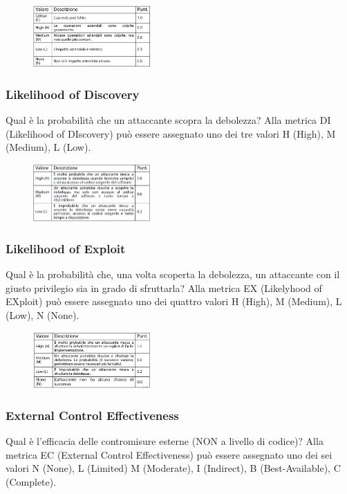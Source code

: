 \begin{figure}[hbpt!]
    \centering
    \includegraphics[width=0.4\textwidth]{./Images/cap3/3.15.png}
\end{figure}
\FloatBarrier

\subsubsection{Likelihood of Discovery}
Qual è la probabilità che un attaccante
scopra la debolezza? Alla metrica DI (Likelihood of DIscovery)
può essere assegnato uno dei tre valori
H (High), M (Medium), L (Low).

\begin{figure}[hbpt!]
    \centering
    \includegraphics[width=0.4\textwidth]{./Images/cap3/3.16.png}
\end{figure}
\FloatBarrier


\subsubsection{Likelihood of Exploit}
Qual è la probabilità che, una volta scoperta la
debolezza, un attaccante con il giusto privilegio
sia in grado di sfruttarla? Alla metrica EX (Likelyhood of EXploit) può essere
assegnato uno dei quattro valori
H (High), M (Medium), L (Low), N (None).

\begin{figure}[hbpt!]
    \centering
    \includegraphics[width=0.4\textwidth]{./Images/cap3/3.17.png}
\end{figure}
\FloatBarrier

\subsubsection{External Control Effectiveness}
Qual è l’efficacia delle contromisure esterne
(NON a livello di codice)? Alla metrica EC (External Control Effectiveness) può essere
assegnato uno dei sei valori
N (None), L (Limited) M (Moderate),
I (Indirect), B (Best-Available), C (Complete).

